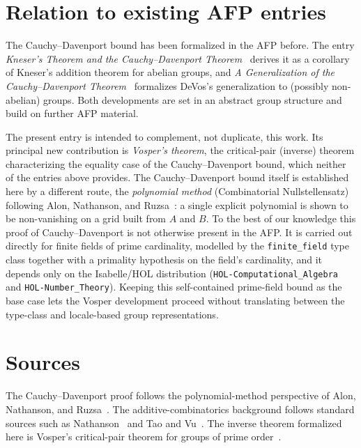 \documentclass[11pt,a4paper]{article}
\begin{document}
\section{Relation to existing AFP entries}

The Cauchy--Davenport bound has been formalized in the AFP before. The entry
\emph{Kneser's Theorem and the Cauchy--Davenport
Theorem}~\cite{Baksys_Kneser_CD_AFP} derives it as a corollary of Kneser's
addition theorem for abelian groups, and \emph{A Generalization of the
Cauchy--Davenport Theorem}~\cite{Baksys_Generalized_CD_AFP} formalizes DeVos's
generalization to (possibly non-abelian) groups. Both developments are set in an
abstract group structure and build on further AFP material.

The present entry is intended to complement, not duplicate, this work. Its
principal new contribution is \emph{Vosper's theorem}, the critical-pair
(inverse) theorem characterizing the equality case of the Cauchy--Davenport
bound, which neither of the entries above provides. The Cauchy--Davenport bound
itself is established here by a different route, the \emph{polynomial method}
(Combinatorial Nullstellensatz) following Alon, Nathanson, and
Ruzsa~\cite{AlonNathansonRuzsa1996}: a single explicit polynomial is shown to be
non-vanishing on a grid built from $A$ and $B$. To the best of our knowledge
this proof of Cauchy--Davenport is not otherwise present in the AFP. It is
carried out directly for finite fields of prime cardinality, modelled by the
\texttt{finite\_field} type class together with a primality hypothesis on the
field's cardinality, and it depends only on the Isabelle/HOL distribution
(\texttt{HOL-Computational\_Algebra} and \texttt{HOL-Number\_Theory}). Keeping
this self-contained prime-field bound as the base case lets the Vosper
development proceed without translating between the type-class and locale-based
group representations.

\section{Sources}

The Cauchy--Davenport proof follows the polynomial-method perspective of Alon,
Nathanson, and Ruzsa~\cite{AlonNathansonRuzsa1996}. The additive-combinatorics
background follows standard sources such as Nathanson~\cite{Nathanson1996} and
Tao and Vu~\cite{TaoVu2006}. The inverse theorem formalized here is Vosper's
critical-pair theorem for groups of prime order~\cite{Vosper1956}.

\tableofcontents

\sloppy

\fussy



\end{document}
